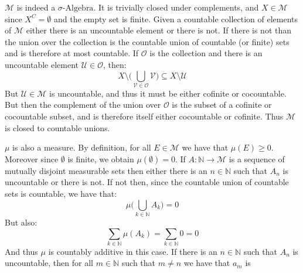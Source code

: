 \documentclass[crop=false,class=article]{standalone}                           %
\begin{document}
        \begin{solution}
            $\mathcal{M}$ is indeed a $\sigma\textrm{-Algebra}$. It is trivially
            closed under complements, and $X\in\mathcal{M}$ since
            $X^{C}=\emptyset$ and the empty set is finite. Given a countable
            collection of elements of $\mathcal{M}$ either there is an
            uncountable element or there is not. If there is not than the union
            over the collection is the countable union of countable (or finite)
            sets and is therefore at most countable. If $\mathcal{O}$ is the
            collection and there is an uncountable element
            $\mathcal{U}\in\mathcal{O}$, then:
            \begin{equation}
                X\setminus\Big(
                    \bigcup_{\mathcal{V}\in\mathcal{O}}\mathcal{V}
                \Big)
                \subseteq{X}\setminus\mathcal{U}
            \end{equation}
            But $\mathcal{U}\in\mathcal{M}$ is uncountable, and thus it must
            be either cofinite or cocountable. But then the complement of the
            union over $\mathcal{O}$ is the subset of a cofinite or cocountable
            subset, and is therefore itself either cocountable or cofinite. Thus
            $\mathcal{M}$ is closed to countable unions.
            \par\hfill\par
            $\mu$ is also a measure. By definition, for all $E\in\mathcal{M}$
            we have that $\mu(E)\geq{0}$. Moreover since $\emptyset$ is finite,
            we obtain $\mu(\emptyset)=0$. If
            $A:\mathbb{N}\rightarrow\mathcal{M}$ is a sequence of mutually
            disjoint measurable sets then either there is an $n\in\mathbb{N}$
            such that $A_{n}$ is uncountable or there is not. If not then, since
            the countable union of countable sets is countable, we have that:
            \begin{equation}
                \mu\Big(\bigcup_{k\in\mathbb{N}}A_{k}\Big)=0
            \end{equation}
            But also:
            \begin{equation}
                \sum_{k\in\mathbb{N}}\mu(A_{k})=\sum_{k\in\mathbb{N}}0=0
            \end{equation}
            And thus $\mu$ is countably additive in this case. If there is an
            $n\in\mathbb{N}$ such that $A_{n}$ is uncountable, then for all
            $m\in\mathbb{N}$ such that $m\ne{n}$ we have that $a_{m}$ is

\end{solution}
\end{document}
